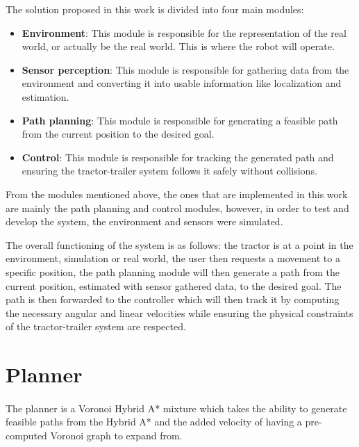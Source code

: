 The solution proposed in this work is divided into four main modules:
\begin{itemize}
    \item \textbf{Environment}: This module is responsible for the representation of the real world, or actually be the real world. This is where the robot will operate.
    \item \textbf{Sensor perception}: This module is responsible for gathering data from the environment and converting it into usable information like localization and estimation.
    \item \textbf{Path planning}: This module is responsible for generating a feasible path from the current position to the desired goal.
    \item \textbf{Control}: This module is responsible for tracking the generated path and ensuring the tractor-trailer system follows it safely without collisions.
\end{itemize}

From the modules mentioned above, the ones that are implemented in this work are mainly 
the path planning and control modules, however, in order to test and develop the system, 
the environment and sensors were simulated.

The overall functioning of the system is as follows: the tractor is at a point in the environment, simulation or real world, 
the user then requests a movement to a specific position, the path planning module will then generate a path from the current 
position, estimated with sensor gathered data, to the desired goal. The path is then forwarded to the 
controller which will then track it by computing the necessary angular and linear velocities while ensuring the 
physical constraints of the tractor-trailer system are respected.
 

\section{Planner}
\label{sec:planner1}
\paragraph{}The planner is a Voronoi Hybrid A* mixture which takes the 
ability to generate feasible paths from the Hybrid A* and the 
added velocity of having a pre-computed Voronoi graph to expand 
from.

